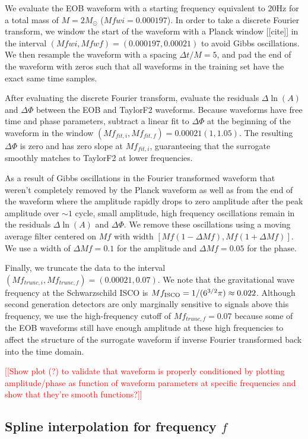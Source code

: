 \documentclass[prd,aps,letter,twocolumn,floatfix,notitlepage,nofootinbib]{revtex4-1}
\newcommand{\red}[1]{\textcolor{red}{#1}}
\begin{document}
We evaluate the EOB waveform with a starting frequency equivalent to 20Hz for a total mass of $M=2M_\odot$ ($Mfwi=0.000197$). In order to take a discrete Fourier transform, we window the start of the waveform with a Planck window [[cite]] in the interval $(Mfwi, Mfwf) = (0.000197, 0.00021)$ to avoid Gibbs oscillations. We then resample the waveform with a spacing $\Delta t/M = 5$, and pad the end of the waveform with zeros such that all waveforms in the training set have the exact same time samples.

After evaluating the discrete Fourier transform, evaluate the residuals $\Delta\ln(A)$ and $\Delta\Phi$ between the EOB and TaylorF2 waveforms. Because waveforms have free time and phase parameters, subtract a linear fit to $\Delta\Phi$ at the beginning of the waveform in the window $(Mf_{fit,i}, Mf_{fit,f}) = 0.00021(1, 1.05)$. The resulting $\Delta\Phi$ is zero and has zero slope at $Mf_{fit,i}$, guaranteeing that the surrogate smoothly matches to TaylorF2 at lower frequencies.

As a result of Gibbs oscillations in the Fourier transformed waveform that weren't completely removed by the Planck waveform as well as from the end of the waveform where the amplitude rapidly drops to zero amplitude after the peak amplitude over $\sim 1$ cycle, small amplitude, high frequency oscillations remain in the residuals $\Delta\ln(A)$ and $\Delta\Phi$. We remove these oscillations using a moving average filter centered on $Mf$ with width $[Mf(1-\Delta Mf), Mf(1+\Delta Mf)]$. We use a width of $\Delta Mf=0.1$ for the amplitude and $\Delta Mf=0.05$ for the phase. 

Finally, we truncate the data to the interval $(Mf_{trunc,i}, Mf_{trunc,f}) = (0.00021, 0.07)$. We note that the gravitational wave frequency at the Schwarzschild ISCO is $Mf_{\rm ISCO} = 1/(6^{3/2}\pi) \approx 0.022$. Although second generation detectors are only marginally sensitive to signals above this frequency, we use the high-frequency cutoff of $Mf_{trunc,f}=0.07$ because some of the EOB waveforms still have enough amplitude at these high frequencies to affect the structure of the surrogate waveform if inverse Fourier transformed back into the time domain.

\red{[[Show plot (?) to validate that waveform is properly conditioned by plotting amplitude/phase as function of waveform parameters at specific frequencies and show that they're smooth functions?]]}


\subsection{Spline interpolation for frequency $f$}
\end{document}

